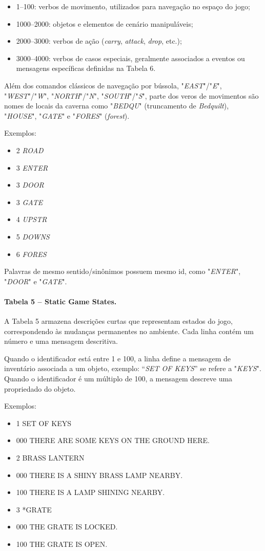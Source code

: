 \documentclass[12pt,a4paper]{article}
\begin{document}
\begin{itemize}
  \item 1–100: verbos de movimento, utilizados para navegação no espaço do jogo;  
  \item 1000–2000: objetos e elementos de cenário manipuláveis;  
  \item 2000–3000: verbos de ação (\textit{carry}, \textit{attack}, \textit{drop}, etc.);  
  \item 3000–4000: verbos de casos especiais, geralmente associados a eventos ou mensagens específicas definidas na Tabela 6.  
\end{itemize}

Além dos comandos clássicos de navegação por bússola, "\textit{EAST}"/"\textit{E}", "\textit{WEST}"/"\textit{W}", "\textit{NORTH}"/"\textit{N}", "\textit{SOUTH}"/"\textit{S}", parte dos veros de movimentos são nomes de locais da caverna como "\textit{BEDQU}" (truncamento de \textit{Bedquilt}), "\textit{HOUSE}", "\textit{GATE}" e "\textit{FORES}" (\textit{forest}).

Exemplos:  
\begin{itemize}
    \item 2 \textit{ROAD}
    \item 3 \textit{ENTER}
    \item 3 \textit{DOOR}
    \item 3 \textit{GATE}
    \item 4 \textit{UPSTR}
    \item 5 \textit{DOWNS}
    \item 6 \textit{FORES}
\end{itemize}

Palavras de mesmo sentido/sinônimos possuem mesmo id, como "\textit{ENTER}", "\textit{DOOR}" e "\textit{GATE}".

\paragraph{Tabela 5 – Static Game States.}  
A Tabela 5 armazena descrições curtas que representam estados do jogo, correspondendo às mudanças permanentes no ambiente. Cada linha contém um número e uma mensagem descritiva.  

Quando o identificador está entre 1 e 100, a linha define a mensagem de inventário associada a um objeto, exemplo: “\textit{SET OF KEYS}” se refere a "\textit{KEYS}". Quando o identificador é um múltiplo de 100, a mensagem descreve uma propriedado do objeto. 

Exemplos:  
\begin{itemize}
    \item 1	SET OF KEYS
    \item 000	THERE ARE SOME KEYS ON THE GROUND HERE.
    \item 2	BRASS LANTERN
    \item 000	THERE IS A SHINY BRASS LAMP NEARBY.
    \item 100	THERE IS A LAMP SHINING NEARBY.
    \item 3	*GRATE
    \item 000	THE GRATE IS LOCKED.
    \item 100	THE GRATE IS OPEN.
\end{itemize}
\end{document}
